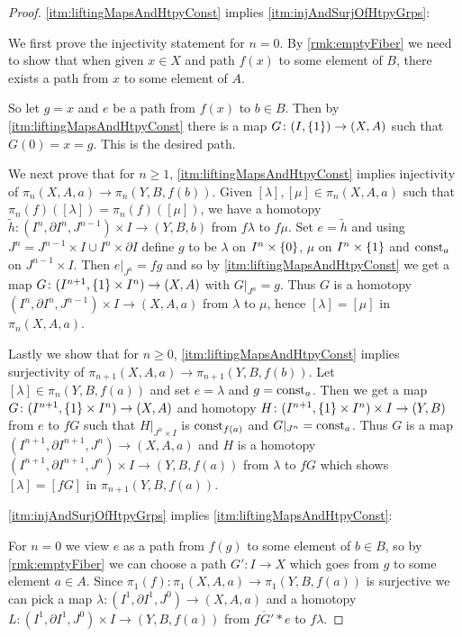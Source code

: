 \begin{prop}
\begin{proof}
        \ref{itm:liftingMapsAndHtpyConst} implies \ref{itm:injAndSurjOfHtpyGrps}:

        We first prove the injectivity statement for $n=0$. 
        By \cref{rmk:emptyFiber} we need to show that when given $x\in X$ and path $f(x)$ to some element of $B$, there exists a path from $x$ to some element of $A$.

        So let $g=x$ and $e$ be a path from $f(x)$ to $b\in B$.
        Then by \ref{itm:liftingMapsAndHtpyConst} there is a map $G\colon (I,\left\lbrace1\right\rbrace)\to(X,A)$ such that $G(0)=x=g$.
        This is the desired path.

        We next prove that for $n\geq 1$, \ref{itm:liftingMapsAndHtpyConst} implies injectivity of $\pi_n(X,A,a)\to \pi_n(Y,B,f(b))$.
        Given $[\lambda],[\mu]\in\pi_n(X,A,a)$ such that $\pi_n(f)([\lambda])=\pi_n(f)([\mu])$, we have a homotopy $\widetilde{h}\colon(I^n,\partial I^n,J^{n-1})\times I\to (Y,B,b)$ from $f\lambda$ to $f\mu$.
        Set $e=\widetilde{h}$ and using $J^n=J^{n-1}\times I\cup I^n\times\partial I$ define $g$ to be $\lambda$ on $I^n\times\left\lbrace0\right\rbrace$, $\mu$ on $I^n\times\left\lbrace1\right\rbrace$ and $\operatorname{const}_a$ on $J^{n-1}\times I$.
        Then $e|_{J^n}=fg$ and so by \ref{itm:liftingMapsAndHtpyConst} we get a map $G\colon(I^{n+1},\left\lbrace1\right\rbrace\times I^n)\to(X,A)$ with $G|_{J^n}=g$. 
        Thus $G$ is a homotopy $(I^n,\partial I^n,J^{n-1})\times I\to(X,A,a)$ from $\lambda$ to $\mu$, hence $[\lambda]=[\mu]$ in $\pi_n(X,A,a)$.

        Lastly we show that for $n\geq 0$, \ref{itm:liftingMapsAndHtpyConst} implies surjectivity of $\pi_{n+1}(X,A,a)\to \pi_{n+1}(Y,B,f(b))$.
        Let $[\lambda]\in\pi_n(Y,B,f(a))$ and set $e=\lambda$ and $g=\operatorname{const}_a$. 
        Then we get a map $G\colon(I^{n+1},\left\lbrace1\right\rbrace\times I^n)\to(X,A)$ and homotopy $H\colon(I^{n+1},\left\lbrace1\right\rbrace\times I^n)\times I\to(Y,B)$ from $e$ to $fG$ such that $H|_{J^n\times I}$ is $\operatorname{const}_{f(a)}$ and $G|_{J^n}=\operatorname{const}_a$.
        Thus $G$ is a map $(I^{n+1},\partial I^{n+1},J^n)\to (X,A,a)$ and $H$ is a homotopy $(I^{n+1},\partial I^{n+1},J^n)\times I\to(Y,B,f(a))$ from $\lambda$ to $fG$ which shows $[\lambda]=[fG]$ in $\pi_{n+1}(Y,B,f(a))$.

        \ref{itm:injAndSurjOfHtpyGrps} implies \ref{itm:liftingMapsAndHtpyConst}:

        For $n=0$ we view $e$ as a path from $f(g)$ to some element of $b\in B$, so by \cref{rmk:emptyFiber} we can choose a path $G'\colon I\to X$ which goes from $g$ to some element $a\in A$.
        Since $\pi_1(f)\colon\pi_1(X,A,a)\to\pi_1(Y,B,f(a))$ is surjective we can pick a map $\lambda\colon(I^1,\partial I^1,J^0)\to(X,A,a)$ and a homotopy $L\colon(I^1,\partial I^1,J^0)\times I\to(Y,B,f(a))$ from $\overline{fG'}*e$ to $f\lambda$.
        

\end{proof}
\end{prop}
